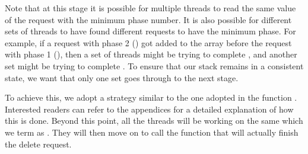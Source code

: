 \documentclass{llncs}
\begin{document}
\begin{comment}
\vspace{-5mm}
\begin{algorithm}
\scriptsize
\SetAlgoLined
\textbf{clean}(, ){}\\
  ()\\
    DeleteRequest(, , , ) \\
[]    \label{line:alldel}\\
()\\


\textbf{helpDelete}(){}\\
			(, )    \{ ,   ,  = ,
 = \textbf{true} \} \\
			\If{()  (  )}{
				break
			}
			() \\
			\If{} {
				
			}
\caption{ and  methods} \label{alg:clean}
\end{algorithm}
\end{comment}
\begin{comment}
\vspace{-5mm}	
\begin{algorithm}
\scriptsize
\SetAlgoLined
\textbf{uniqueDelete}(){}\\
		\While{}
		{
			  ()\\
			\If{! \label{line:deluniquepending} }
			{
				\If{}
				{
					  () ? . (,
) :
\textbf{true} \label{line:cleanCAS}\\
					()\\
					\If{} {
						
					}
				}
			}
		\Else{
				()
			}
		}
\caption{The  method} \label{alg:clean2}
\end{algorithm}
\end{comment}


Note that at this stage it is possible for multiple threads to read the same value of the request with the 
minimum phase number. It is also possible for different sets of threads to have found different requests
to have the minimum phase. For example, if a request with phase 2 () got added to the array before the 
request with phase 1 (), then a set of threads might be trying to complete , and another set might 
be trying to complete . To ensure that our stack remains in a consistent state, we want that only one 
set goes through to the next stage.

To achieve this, we adopt a strategy similar to the one adopted in the function . 
Interested readers can refer to the appendices for a detailed explanation of how this is done.
Beyond this point, all the threads will be working on the same  which we term as . 
They will then move on to call the  function that will actually finish the delete request.
\end{document}
